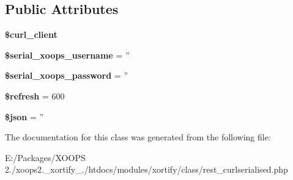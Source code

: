 \subsection*{Public Attributes}
\begin{DoxyCompactItemize}
\item 
\hypertarget{class_r_e_s_t___c_u_r_l_s_e_r_i_a_l_i_s_e_d_xortify_exchange_a920981837664e61120892d568554cf67}{{\bfseries \$curl\-\_\-client}}\label{class_r_e_s_t___c_u_r_l_s_e_r_i_a_l_i_s_e_d_xortify_exchange_a920981837664e61120892d568554cf67}

\item 
\hypertarget{class_r_e_s_t___c_u_r_l_s_e_r_i_a_l_i_s_e_d_xortify_exchange_a820b2a67eaf75b081d1b92990feb2277}{{\bfseries \$serial\-\_\-xoops\-\_\-username} = ''}\label{class_r_e_s_t___c_u_r_l_s_e_r_i_a_l_i_s_e_d_xortify_exchange_a820b2a67eaf75b081d1b92990feb2277}

\item 
\hypertarget{class_r_e_s_t___c_u_r_l_s_e_r_i_a_l_i_s_e_d_xortify_exchange_af5cf1afa435a37f679a0e8a30988de90}{{\bfseries \$serial\-\_\-xoops\-\_\-password} = ''}\label{class_r_e_s_t___c_u_r_l_s_e_r_i_a_l_i_s_e_d_xortify_exchange_af5cf1afa435a37f679a0e8a30988de90}

\item 
\hypertarget{class_r_e_s_t___c_u_r_l_s_e_r_i_a_l_i_s_e_d_xortify_exchange_ab80cc51ccc79c13eb26524a4c00e34c9}{{\bfseries \$refresh} = 600}\label{class_r_e_s_t___c_u_r_l_s_e_r_i_a_l_i_s_e_d_xortify_exchange_ab80cc51ccc79c13eb26524a4c00e34c9}

\item 
\hypertarget{class_r_e_s_t___c_u_r_l_s_e_r_i_a_l_i_s_e_d_xortify_exchange_ab9a6c2da2604c62741301d2e5830f085}{{\bfseries \$json} = ''}\label{class_r_e_s_t___c_u_r_l_s_e_r_i_a_l_i_s_e_d_xortify_exchange_ab9a6c2da2604c62741301d2e5830f085}

\end{DoxyCompactItemize}


The documentation for this class was generated from the following file\-:\begin{DoxyCompactItemize}
\item 
E\-:/\-Packages/\-X\-O\-O\-P\-S 2./xoops2.\-\_\-xortify\-\_./htdocs/modules/xortify/class/rest\-\_\-curlserialised.\-php\end{DoxyCompactItemize}

